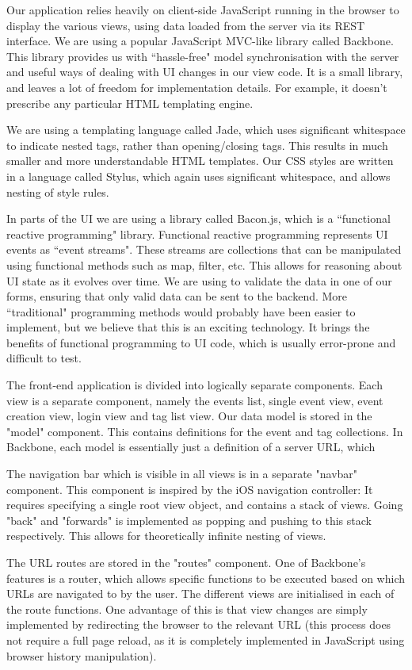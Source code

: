 \documentclass[11pt]{article}
\begin{document}
Our application relies heavily on client-side JavaScript running in the browser to display the various views, using data loaded from the server via its REST interface.
We are using a popular JavaScript MVC-like library called Backbone. This library provides us with ``hassle-free" model synchronisation with the server and useful ways of dealing with UI changes in our view code. It is a small library, and leaves a lot of freedom for implementation details. For example, it doesn't prescribe any particular HTML templating engine.

We are using a templating language called Jade, which uses significant whitespace to indicate nested tags, rather than opening/closing tags. This results in much smaller and more understandable HTML templates. Our CSS styles are written in a language called Stylus, which again uses significant whitespace, and allows nesting of style rules.

In parts of the UI we are using a library called Bacon.js, which is a ``functional reactive programming" library. Functional reactive programming represents UI events as ``event streams". These streams are collections that can be manipulated using functional methods such as map, filter, etc. This allows for reasoning about UI state as it evolves over time. We are using to validate the data in one of our forms, ensuring that only valid data can be sent to the backend. More ``traditional" programming methods would probably have been easier to implement, but we believe that this is an exciting technology. It brings the benefits of functional programming to UI code, which is usually error-prone and difficult to test.

The front-end application is divided into logically separate components. Each view is a separate component, namely the events list, single event view, event creation view, login view and tag list view. Our data model is stored in the "model" component. This contains definitions for the event and tag collections. In Backbone, each model is essentially just a definition of a server URL, which 

The navigation bar which is visible in all views is in a separate "navbar" component. This component is inspired by the iOS navigation controller: It requires specifying a single root view object, and contains a stack of views. Going "back" and "forwards" is implemented as popping and pushing to this stack respectively. This allows for theoretically infinite nesting of views.

The URL routes are stored in the "routes" component. One of Backbone's features is a router, which allows specific functions to be executed based on which URLs are navigated to by the user. The different views are initialised in each of the route functions. One advantage of this is that view changes are simply implemented by redirecting the browser to the relevant URL (this process does not require a full page reload, as it is completely implemented in JavaScript using browser history manipulation).
\end{document}
